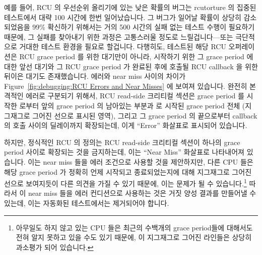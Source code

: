 예를 들어, RCU 의 우선순위 올리기에 있는 낮은 확률의 버그는 rcutorture 의
집중된 테스트에서 대략 100 시간에 한번 일어났습니다.
그 버그가 일어날 확률이 상당히 감소되었음을 99\% 확신하기 위해서는 거의 500
시간의 실패 없는 테스트 수행이 필요하기 때문에, 그 실패를 찾아내기 위한  과정은 고통스러울 정도로 느릴겁니다---또는 극단적으로 거대한 테스트
환경을 필요로 할겁니다.
다행히도, 테스트된 해당 RCU 오퍼레이션은 RCU grace period 를 위한 대기만이
아니라, 시작하기 위한 그 grace period 에 대한 앞선 대기와 그 RCU grace period
가 완료된 후에 호출될 RCU callback 을 위한 뒤이은 대기도 존재했습니다.
 에러와 near miss 사이의 차이가
Figure~\ref{fig:debugging:RCU Errors and Near Misses} 에 보여져 있습니다.
완전히 본격적인 에러로 구분되기 위해서, RCU read-side 크리티컬 섹션은 grace
period 를 시작한  로부터 앞의 grace period 의 남아있는 부분과
 로 시작된 grace period 전체 (지그재그로 그어진 선으로 표시된
영역), 그리고 그 grace period 의 끝으로부터 callback 의 호출 사이의 딜레이까지
확장되는데, 이게 ``Error'' 화살표로 표시되어 있습니다.

하지만, 정식적인 RCU 의 정의는 RCU read-side 크리티컬 섹션이 하나의 grace
period 사이로 확장되는 것을 금지하는데, 이는 ``Near Miss'' 화살표로 나타내어져
있습니다.
이는 near miss 들을 에러 조건으로 사용할 것을 제안하지만, 다른 CPU 들은 해당
grace period 가 정확히 언제 시작되고 종료되었는지에 대해 지그재그로 그어진
선으로 보여지듯이 다른 의견을 가질 수 있기 때문에, 이는 문제가 될 수
있습니다.\footnote{
	아무일도 하지 않고 있는 CPU 들은 최근의 수백개의 grace period들에
	대해서도 전혀 알지 못하고 있을 수도 있기 때문에, 이 지그재그로 그어진
	라인들은 상당히 과소평가 되어 있습니다.}
따라서 이 near miss 들을 에러 컨디션으로 사용하는 것은 거짓 양성 결과를
만들어낼 수 있는데, 이는 자동화된  테스트에서는 제거되어야
합니다.
\iffalse

